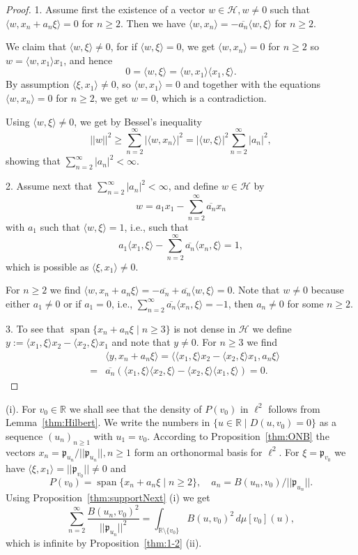 \documentclass [12pt]{article}
\DeclareMathOperator{\spn}{span}
\newcommand{\R}{\mathbb{R}}
\begin{document}
\begin{proof} 1. Assume first the existence of a vector $w\in\mathcal H, w\neq 0$ such that
$\langle w, x_n+a_n\xi\rangle=0$ for $n\ge 2$. Then we have
$\langle w,x_n\rangle=-\overline{a_n}\langle w,\xi\rangle$ for $n\ge 2$.
 
We claim that  $\langle w, \xi\rangle\neq 0$, for if $\langle w, \xi\rangle=0$, we get $\langle w, x_n\rangle=0$ for $n\ge 2$ so $w=\langle w, x_1\rangle x_1$, and hence
$$
0=\langle w, \xi\rangle=\langle w, x_1\rangle \langle x_1, \xi\rangle.
$$
By assumption $\langle \xi, x_1\rangle\neq 0$, so $\langle w, x_1\rangle =0$ and together with the equations $\langle w, x_n\rangle=0$ for $n\ge 2$, we get $w=0$, which is a contradiction. 

Using $\langle w, \xi\rangle\neq 0$, we get by Bessel's inequality
$$
||w||^2\ge \sum_{n=2}^\infty |\langle w, x_n\rangle|^2=|\langle w,\xi\rangle|^2\sum_{n=2}^\infty|a_n|^2,
$$
showing that $\sum_{n=2}^\infty|a_n|^2<\infty$.

2. Assume next that $\sum_{n=2}^\infty|a_n|^2<\infty$, and define $w\in\mathcal H$ by
$$
w=a_1x_1-\sum_{n=2}^\infty \overline{a_n}x_n
$$
with $a_1$ such that $\langle w, \xi\rangle=1$, i.e., such that
$$
a_1\langle x_1,\xi\rangle-\sum_{n=2}^\infty \overline{a_n}\langle x_n, \xi\rangle =1,
$$
which is possible as $\langle \xi, x_1\rangle\neq 0$.

For $n\ge 2$ we find
$\langle w, x_n+a_n\xi\rangle=-\overline{a_n}+\overline{a_n}\langle w, \xi\rangle=0$.
Note that  $w\neq 0$ because either $a_1\neq 0$ or if $a_1=0$, i.e., $\sum_{n=2}^\infty \overline{a_n}\langle x_n, \xi\rangle =-1$, then $a_n\neq 0$ for some $n\ge 2$.

3. To see that $\spn\{x_n+a_n\xi \mid n\ge 3\}$ is not dense in $\mathcal H$ we define
$y:=\langle x_1, \xi\rangle x_2-\langle x_2, \xi\rangle x_1$ and note that $y\neq 0$.
For $n\ge 3$ we find
\begin{eqnarray*}
&&\langle y, x_n+a_n\xi\rangle=\langle \langle x_1,\xi\rangle x_2-\langle x_2, \xi\rangle x_1, a_n\xi\rangle\\
&=& \overline{a_n}\left(\langle x_1, \xi\rangle \langle x_2, \xi\rangle-\langle x_2, \xi\rangle\langle x_1, \xi\rangle\right)=0.
\end{eqnarray*}
\end{proof}


(i). For $v_0\in\R$ we shall see that the density of $P(v_0)$ in $\ell^2$ follows from
 Lemma~\ref{thm:Hilbert}. We write the numbers in $\{u\in\R \mid D(u,v_0)=0\}$ as a sequence $(u_n)_{n\ge 1}$ with $u_1=v_0$. According to Proposition~\ref{thm:ONB} the vectors $x_n=\mathfrak{p}_{u_n}/||\mathfrak{p}_{u_n}||, n\ge 1$ form an orthonormal basis for $\ell^2$. For $\xi=\mathfrak{p}_{v_0}$ we have $\langle \xi, x_1\rangle=||\mathfrak{p}_{v_0}||\neq 0$ and
$$
P(v_0)=\spn\{x_n+a_n\xi \mid n\ge 2\},\quad a_n=B(u_n,v_0)/||\mathfrak{p}_{u_n}||.
$$
Using Proposition~\ref{thm:supportNext} (i) we get
$$
\sum_{n=2}^\infty \frac{B(u_n,v_0)^2}{||\mathfrak{p}_{u_n}||^2}=\int_{\R\setminus\{v_0\}}B(u,v_0)^2\,d\mu[v_0](u),
$$  
which is infinite by Proposition~\ref{thm:1-2} (ii).
\end{document}
